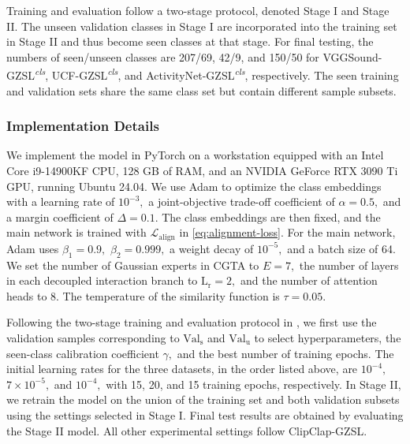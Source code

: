 Training and evaluation follow a two-stage protocol, denoted Stage I and Stage II. The unseen validation classes in Stage I are incorporated into the training set in Stage II and thus become seen classes at that stage. For final testing, the numbers of seen/unseen classes are 207/69, 42/9, and 150/50 for VGGSound-GZSL\textsuperscript{\textit{cls}}, UCF-GZSL\textsuperscript{\textit{cls}}, and ActivityNet-GZSL\textsuperscript{\textit{cls}}, respectively. The seen training and validation sets share the same class set but contain different sample subsets.

\subsubsection{Implementation Details}\label{sec:implementation-details}

We implement the model in PyTorch on a workstation equipped with an Intel Core i9-14900KF CPU, 128 GB of RAM, and an NVIDIA GeForce RTX 3090 Ti GPU, running Ubuntu 24.04. We use Adam \cite{kingma2015adam} to optimize the class embeddings with a learning rate of ${10}^{-3},$ a joint-objective trade-off coefficient of $\alpha =0.5,$ and a margin coefficient of $\Delta =0.1.$ The class embeddings are then fixed, and the main network is trained with ${\mathcal{L}}_{\mathrm{align}}$ in \eqref{eq:alignment-loss}. For the main network, Adam uses ${\beta }_{1}=0.9,$ ${\beta }_{2}=0.999,$ a weight decay of ${10}^{-5},$ and a batch size of 64. We set the number of Gaussian experts in CGTA to $E=7,$ the number of layers in each decoupled interaction branch to ${\mathrm{L}}_{\mathrm{r}}=2,$ and the number of attention heads to 8. The temperature of the similarity function is $\tau =0.05.$

Following the two-stage training and evaluation protocol in \cite{mercea2022avca,kurzendorfer2024clipclap,mercea2022tcaf}, we first use the validation samples corresponding to ${\mathrm{Val}}_{\mathrm{s}}$ and ${\mathrm{Val}}_{\mathrm{u}}$ to select hyperparameters, the seen-class calibration coefficient $\gamma ,$ and the best number of training epochs. The initial learning rates for the three datasets, in the order listed above, are ${10}^{-4},$ $7\times {10}^{-5},$ and ${10}^{-4},$ with 15, 20, and 15 training epochs, respectively. In Stage II, we retrain the model on the union of the training set and both validation subsets using the settings selected in Stage I. Final test results are obtained by evaluating the Stage II model. All other experimental settings follow ClipClap-GZSL.

